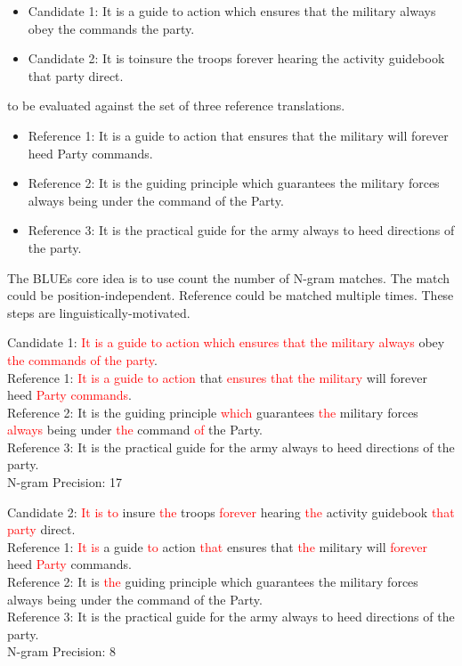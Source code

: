 \documentclass[a4paper]{article}
\newcommand{\red}[1]{\textcolor{red}{#1}}
\begin{document}
\begin{itemize}
  \item Candidate 1: It is  a  guide to action which ensures that  the  military
        always obey  the commands the  party.
  \item Candidate 2: It is  toinsure the troops  forever  hearing  the  activity
        guidebook that party  direct.
\end{itemize}


to be evaluated against the set of three reference translations.


\begin{itemize}
  \item Reference 1: It is a guide to action that ensures that the military will
        forever heed Party commands.
  \item Reference 2: It is the  guiding  principle which guarantees the military
        forces always being under the command of the Party.
  \item Reference 3: It  is  the  practical  guide  for  the army always to heed
        directions of the party.
\end{itemize}


The  BLUEs core idea is to use  count the  number  of N-gram  matches. The match
could  be position-independent. Reference could be matched multiple times. These
steps are linguistically-motivated.


Candidate  1:  \red{It is  a  guide to action which  ensures  that  the military
always} obey \red{the commands of the party}. \\
Reference 1: \red{It is a guide  to action} that \red{ensures that the military}
will forever heed \red{Party commands}. \\
Reference  2:  It  is  the  guiding principle  \red{which}  guarantees \red{the}
military forces \red{always}  being under  \red{the} command \red{of} the Party.
\\
Reference 3: It is the practical guide for the army always to heed directions of
the party. \\
N-gram Precision: 17


Candidate 2: \red{It is to} insure \red {the} troops \red {forever} hearing \red
{the} activity guidebook \red{that party} direct. \\
Reference 1: \red {It is} a guide \red {to} action \red {that} ensures that \red
{the} military will  \red{forever} heed \red{Party} commands. \\ Reference 2: It
is \red{the} guiding principle which guarantees the
military forces always being under the command of the Party. \\ Reference 3:  It
is the practical guide for the army always to heed directions of the party. \\
N-gram Precision: 8
\end{document}
